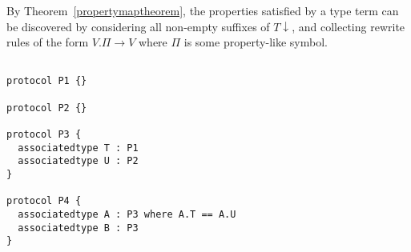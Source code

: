\documentclass[a4paper,headsepline,bibliography=totoc,toc=flat,fleqn,twoside=semi]{scrbook}
\theoremstyle{definition}
\theoremstyle{definition}
\theoremstyle{definition}
\begin{document}
By Theorem~\ref{propertymaptheorem}, the properties satisfied by a type term can be discovered by
considering all non-empty suffixes of ${T}{\downarrow}$, and collecting rewrite rules of the form
$V.\Pi\rightarrow V$ where $\Pi$ is some property-like symbol.

\begin{listing}\label{propmaplisting1}
\begin{Verbatim}

protocol P1 {}

protocol P2 {}

protocol P3 {
  associatedtype T : P1
  associatedtype U : P2
}

protocol P4 {
  associatedtype A : P3 where A.T == A.U
  associatedtype B : P3
}
\end{Verbatim}
\end{listing}
\end{document}
